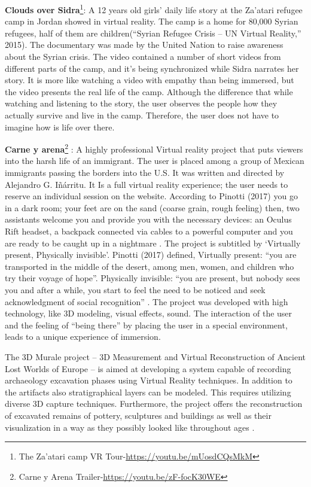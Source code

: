\textbf{Clouds over Sidra}\footnote{The Za’atari camp VR Tour-\url{https://youtu.be/mUosdCQsMkM}}: A 12 years old girls’ daily life story at the Za’atari refugee camp in Jordan
showed in virtual reality. The camp is a home for 80,000 Syrian refugees, half of them are
children(“Syrian Refugee Crisis – UN Virtual Reality,” 2015). The documentary was made by
the United Nation to raise awareness about the Syrian crisis. The video contained a number
of short videos from different parts of the camp, and it’s being synchronized while Sidra
narrates her story. It is more like watching a video with empathy than being immersed, but
the video presents the real life of the camp. Although the difference that while watching and
listening to the story, the user observes the people how they actually survive and live in the
camp. Therefore, the user does not have to imagine how is life over there.


\textbf{Carne y arena}\footnote{Carne y Arena Trailer-\url{https://youtu.be/zF-focK30WE}} : A highly professional
Virtual reality project that puts viewers
into the harsh life of an immigrant. The
user is placed among a group of
Mexican immigrants passing the
borders into the U.S. It was written and
directed by Alejandro G. Iñárritu. It Is a
full virtual reality experience; the user
needs to reserve an individual session
on the website. According to Pinotti (2017) you go in a dark room; your feet are on the sand (coarse grain, rough feeling) then, two assistants welcome you and provide you with the
necessary devices: an Oculus Rift headset, a backpack connected via cables to a powerful
computer and you are ready to be caught up in a nightmare \citep{Pinotti2017}. The project is
subtitled by ‘Virtually present, Physically invisible’. Pinotti (2017) defined, Virtually present:
“you are transported in the middle of the desert, among men, women, and children who try
their voyage of hope”. Physically invisible: “you are present, but nobody sees you and after a
while, you start to feel the need to be noticed and seek acknowledgment of social
recognition” \citep{Pinotti2017}. The project was developed with high technology, like 3D
modeling, visual effects, sound. The interaction of the user and the feeling of “being there”
by placing the user in a special environment, leads to a unique experience of immersion.

The 3D Murale project – 3D Measurement and Virtual Reconstruction of Ancient Lost Worlds of Europe – is aimed at developing a system capable of recording archaeology excavation phases using Virtual Reality techniques. In addition to the artifacts also stratigraphical layers can be modeled. This requires utilizing diverse 3D capture techniques. Furthermore, the project offers the reconstruction of excavated remains of pottery, sculptures and buildings as well as their visualization in a way as they possibly looked like throughout ages \citep{Rahaman2011InterpretingPerspective}.

